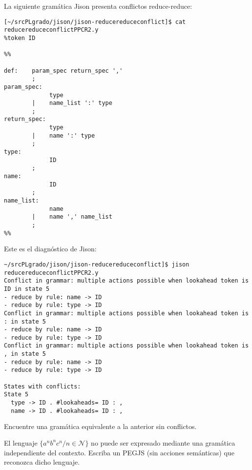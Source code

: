 \item
La siguiente gramática Jison presenta conflictos reduce-reduce:

\begin{verbatim}
[~/srcPLgrado/jison/jison-reducereduceconflict]$ cat reducereduceconflictPPCR2.y
%token ID

%%

def:    param_spec return_spec ','
        ;
param_spec:
             type
        |    name_list ':' type
        ;
return_spec:
             type
        |    name ':' type
        ;
type:        
             ID
        ;
name:        
             ID 
        ;
name_list:
             name
        |    name ',' name_list
        ;
%%
\end{verbatim}
Este es el diagnóstico de Jison:
\begin{verbatim}
~/srcPLgrado/jison/jison-reducereduceconflict]$ jison reducereduceconflictPPCR2.y
Conflict in grammar: multiple actions possible when lookahead token is ID in state 5
- reduce by rule: name -> ID
- reduce by rule: type -> ID
Conflict in grammar: multiple actions possible when lookahead token is : in state 5
- reduce by rule: name -> ID
- reduce by rule: type -> ID
Conflict in grammar: multiple actions possible when lookahead token is , in state 5
- reduce by rule: name -> ID
- reduce by rule: type -> ID

States with conflicts:
State 5
  type -> ID . #lookaheads= ID : ,
  name -> ID . #lookaheads= ID : ,
\end{verbatim}
Encuentre una gramática equivalente a la anterior sin conflictos.


\item
El lenguaje $\{ a^n b^n c^n / n \in \mathcal{N} \}$ no puede ser 
expresado mediante una gramática independiente del contexto.
Escriba un PEGJS (sin acciones semánticas)
que reconozca dicho lenguaje.
 
